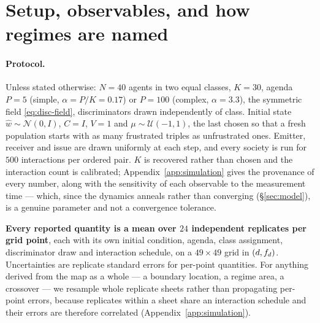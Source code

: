 \section{Setup, observables, and how regimes are named}
\label{sec:setup}

\paragraph{Protocol.}
Unless stated otherwise: $N=40$ agents in two equal classes, $K=30$, agenda
$P=5$ (simple, $\alpha=P/K=0.17$) or $P=100$ (complex, $\alpha=3.3$), the
symmetric field \eqref{eq:disc-field}, discriminators drawn independently of
class. Initial state $\hat{w}\sim\mathcal{N}(0,I)$, $C=I$, $V=1$ and
$\mu\sim\mathcal{U}(-1,1)$, the last chosen so that a fresh population starts
with as many frustrated triples as unfrustrated ones. Emitter, receiver and
issue are drawn uniformly at each step, and every society is run for $500$
interactions per ordered pair. $K$ is recovered rather than chosen and the
interaction count is calibrated; Appendix~\ref{app:simulation} gives the
provenance of every number, along with the sensitivity of each observable to the
measurement time --- which, since the dynamics anneals rather than converging
(\S\ref{sec:model}), is a genuine parameter and not a convergence tolerance.

\textbf{Every reported quantity is a mean over $24$ independent replicates per
grid point}, each with its own initial condition, agenda, class assignment,
discriminator draw and interaction schedule, on a $49\times49$ grid in
$(d,f_{d})$. Uncertainties are replicate standard errors for per-point quantities.
For anything derived from the map as a whole --- a boundary location, a regime
area, a crossover --- we resample whole replicate sheets rather than propagating
per-point errors, because replicates within a sheet share an interaction
schedule and their errors are therefore correlated
(Appendix~\ref{app:simulation}).

